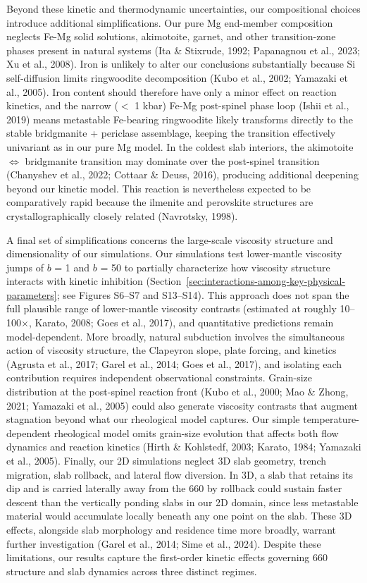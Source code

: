 \documentclass[draft,linenumbers]{agujournal2019}
\begin{document}
Beyond these kinetic and thermodynamic uncertainties, our compositional
choices introduce additional simplifications. Our pure Mg end-member
composition neglects Fe-Mg solid solutions, akimotoite, garnet, and
other transition-zone phases present in natural systems (Ita \&
Stixrude, 1992; Papanagnou et al., 2023; Xu et al., 2008). Iron is
unlikely to alter our conclusions substantially because Si
self-diffusion limits ringwoodite decomposition (Kubo et al., 2002;
Yamazaki et al., 2005). Iron content should therefore have only a minor
effect on reaction kinetics, and the narrow (\(<\) 1 kbar) Fe-Mg
post-spinel phase loop ({Ishii et al.}, 2019) means metastable
Fe-bearing ringwoodite likely transforms directly to the stable
bridgmanite + periclase assemblage, keeping the transition effectively
univariant as in our pure Mg model. In the coldest slab interiors, the
akimotoite \(\Leftrightarrow\) bridgmanite transition may dominate over
the post-spinel transition ({Chanyshev et al.}, 2022; Cottaar \& Deuss,
2016), producing additional deepening beyond our kinetic model. This
reaction is nevertheless expected to be comparatively rapid because the
ilmenite and perovskite structures are crystallographically closely
related (Navrotsky, 1998).

A final set of simplifications concerns the large-scale viscosity
structure and dimensionality of our simulations. Our simulations test
lower-mantle viscosity jumps of \(b\) = 1 and \(b\) = 50 to partially
characterize how viscosity structure interacts with kinetic inhibition
(Section~\ref{sec:interactions-among-key-physical-parameters}; see
Figures S6--S7 and S13--S14). This approach does not span the full
plausible range of lower-mantle viscosity contrasts (estimated at
roughly 10--100\(\times\), Karato, 2008; {Goes et al.}, 2017), and
quantitative predictions remain model-dependent. More broadly, natural
subduction involves the simultaneous action of viscosity structure, the
Clapeyron slope, plate forcing, and kinetics ({Agrusta et al.}, 2017;
Garel et al., 2014; {Goes et al.}, 2017), and isolating each
contribution requires independent observational constraints. Grain-size
distribution at the post-spinel reaction front (Kubo et al., 2000; Mao
\& Zhong, 2021; Yamazaki et al., 2005) could also generate viscosity
contrasts that augment stagnation beyond what our rheological model
captures. Our simple temperature-dependent rheological model omits
grain-size evolution that affects both flow dynamics and reaction
kinetics (Hirth \& Kohlstedf, 2003; Karato, 1984; Yamazaki et al.,
2005). Finally, our 2D simulations neglect 3D slab geometry, trench
migration, slab rollback, and lateral flow diversion. In 3D, a slab that
retains its dip and is carried laterally away from the 660 by rollback
could sustain faster descent than the vertically ponding slabs in our 2D
domain, since less metastable material would accumulate locally beneath
any one point on the slab. These 3D effects, alongside slab morphology
and residence time more broadly, warrant further investigation (Garel et
al., 2014; {Sime et al.}, 2024). Despite these limitations, our results
capture the first-order kinetic effects governing 660 structure and slab
dynamics across three distinct regimes.
\end{document}
